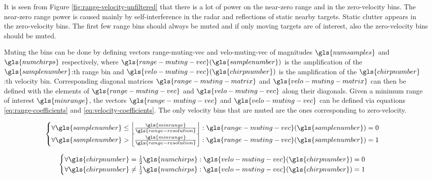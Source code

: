 It is seen from Figure \ref{fig:range-velocity-unfiltered} that there is a lot of power on the near-zero range and in the zero-velocity bins.
The near-zero range power is caused mainly by self-interference in the radar and reflections of static nearby targets.
Static clutter appears in the zero-velocity bins.
The first few range bins should always be muted and if only moving targets are of interest,
also the zero-velocity bins should be muted.

Muting the bins can be done by defining vectors \gls{range-muting-vec} and \gls{velo-muting-vec} of magnitudes $\gls{numsamples}$ and $\gls{numchirps}$ respectively,
where $\gls{range-muting-vec}(\gls{samplenumber})$ is the amplification of the $\gls{samplenumber}$:th range bin
and $\gls{velo-muting-vec}(\gls{chirpnumber})$ is the amplification of the $\gls{chirpnumber}$:th velocity bin.
Corresponding diagonal matrices $\gls{range-muting-matrix}$ and $\gls{velo-muting-matrix}$ can then be defined with the elements
of $\gls{range-muting-vec}$ and $\gls{velo-muting-vec}$ along their diagonals.
Given a minimum range of interest $\gls{minrange}$,
the vectors $\gls{range-muting-vec}$ and $\gls{velo-muting-vec}$ can be defined via equations
\ref{eq:range-coefficients} and \ref{eq:velocity-coefficients}.
The only velocity bins that are muted are the ones corresponding to zero-velocity.

\begin{equation}
\label{eq:range-coefficients}
    \begin{cases}
        \forall \gls{samplenumber} \leq \left \lfloor \frac{ \gls{minrange} }{ \gls{range-resolution} } \right \rfloor :
            \gls{range-muting-vec}(\gls{samplenumber}) = 0 \\
        \forall \gls{samplenumber} > \left \lfloor \frac{ \gls{minrange} }{ \gls{range-resolution} } \right \rfloor :
            \gls{range-muting-vec}(\gls{samplenumber}) = 1
    \end{cases}
\end{equation}

\begin{equation}
\label{eq:velocity-coefficients}
    \begin{cases}
        \forall \gls{chirpnumber} = \frac{1}{2}\gls{numchirps} :
            \gls{velo-muting-vec}(\gls{chirpnumber}) = 0 \\
        \forall \gls{chirpnumber} \neq \frac{1}{2}\gls{numchirps} :
            \gls{velo-muting-vec}(\gls{chirpnumber}) = 1
    \end{cases}
\end{equation}


